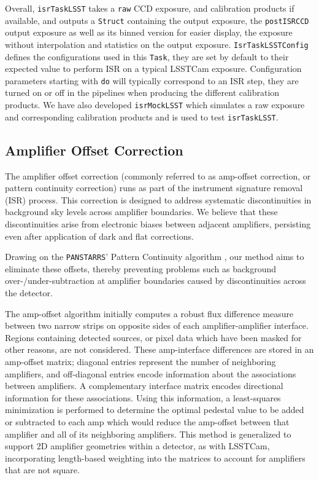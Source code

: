Overall, \texttt{isrTaskLSST} takes a \texttt{raw} CCD exposure, and calibration products if available, and outputs a \texttt{Struct} containing the output exposure, the \texttt{postISRCCD} output exposure as well as its binned version for easier display, the exposure without interpolation and statistics on the output exposure.
\texttt{IsrTaskLSSTConfig} defines the configurations used in this \texttt{Task}, they are set by default to their expected value to perform ISR on a typical LSSTCam exposure. Configuration parameters starting with \texttt{do} will typically correspond to an ISR step, they are turned on or off in the pipelines when producing the different calibration products.
We have also developed \texttt{isrMockLSST} which simulates a raw exposure and corresponding calibration products and is used to test \texttt{isrTaskLSST}.


\subsection{Amplifier Offset Correction}
\label{sec:isr:ampoffset}
The amplifier offset correction (commonly referred to as amp-offset correction, or pattern continuity correction) runs as part of the instrument signature removal (ISR) process.
This correction is designed to address systematic discontinuities in background sky levels across amplifier boundaries.
We believe that these discontinuities arise from electronic biases between adjacent amplifiers, persisting even after application of dark and flat corrections.

Drawing on the \texttt{PANSTARRS}' Pattern Continuity algorithm \citep{2020ApJS..251....4W}, our method aims to eliminate these offsets, thereby preventing problems such as background over-/under-subtraction at amplifier boundaries caused by discontinuities across the detector.

The amp-offset algorithm initially computes a robust flux difference measure between two narrow strips on opposite sides of each amplifier-amplifier interface.
Regions containing detected sources, or pixel data which have been masked for other reasons, are not considered.
These amp-interface differences are stored in an amp-offset matrix; diagonal entries represent the number of neighboring amplifiers, and off-diagonal entries encode information about the associations between amplifiers.
A complementary interface matrix encodes directional information for these associations.
Using this information, a least-squares minimization is performed to determine the optimal pedestal value to be added or subtracted to each amp which would reduce the amp-offset between that amplifier and all of its neighboring amplifiers.
This method is generalized to support 2D amplifier geometries within a detector, as with LSSTCam, incorporating length-based weighting into the matrices to account for amplifiers that are not square.

